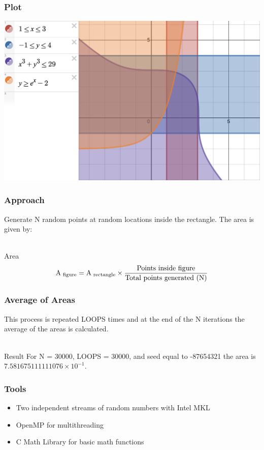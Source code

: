\documentclass{beamer}
\begin{document}
\begin{frame}
\frametitle{Plot}
\includegraphics[width=\textwidth,height=\textheight,keepaspectratio]{full_system.png}
\end{frame}

\begin{frame}
\frametitle{Approach}
Generate N random points at random locations inside the rectangle. The area is given by:\\~\
\begin{block}{Area}
$$\textnormal{A}_\textnormal{ figure}=
\textnormal{A}_{\textnormal{ rectangle}}\times\frac{\textnormal{Points inside figure}}{\textnormal{Total points generated (N)}}$$
\end{block}
\end{frame}

\begin{frame}
\frametitle{Average of Areas}
This process is repeated LOOPS times and at the end of the N iterations the average of the areas is calculated.
\\~\
\begin{block}{Result}
For N = 30000, LOOPS = 30000, and seed equal to -87654321 the area is $7.581675111111076\times10^{-1}$.
\end{block}
\end{frame}

\begin{frame}
\frametitle{Tools}
\begin{itemize}
\item Two independent streams of random numbers with Intel MKL
\item OpenMP for multithreading
\item C Math Library for basic math functions
\end{itemize}
\end{frame}
\end{document}

